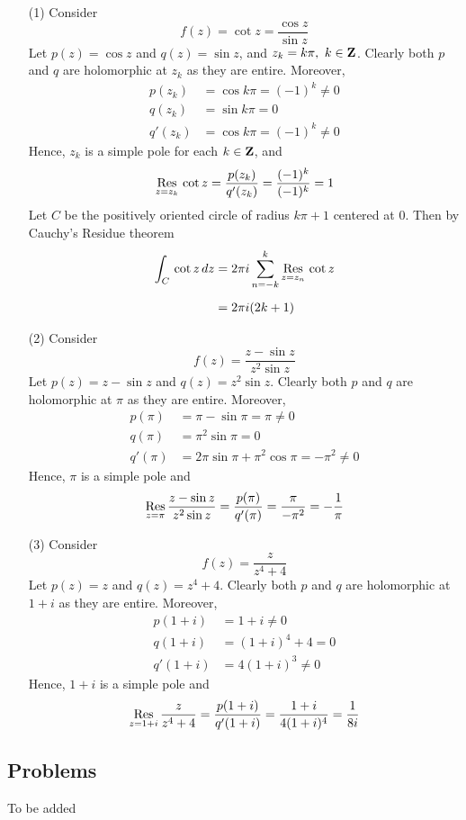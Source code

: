 \begin{example}\hfill
\begin{itemize}[itemsep=1em]
\item[(1)] Consider \[f(z) = \cot z = \frac{\cos z}{\sin z}\] Let $p(z) = \cos z$ and $q(z) = \sin z$, and $z_k = k\pi,\ k \in \mathbf Z$. Clearly both $p$ and $q$ are holomorphic at $z_k$ as they are entire. Moreover,
\begin{align*}
p(z_k) &= \cos k\pi = (-1)^k \neq 0\\[0.5em]
q(z_k) &= \sin k\pi = 0\\[0.5em]
q'(z_k) &= \cos k\pi = (-1)^k \neq 0
\end{align*}
Hence, $z_k$ is a simple pole for each $k \in \mathbf Z$, and
\[\underset{z = {z_k}}{\operatorname{Res}}\,\cot z = \frac{p(z_k)}{q'(z_k)} = \frac{(-1)^k}{(-1)^k} = 1\]
Let $C$ be the positively oriented circle of radius $k\pi + 1$ centered at $0$. Then by Cauchy's Residue theorem
\begin{align*}
\int_C\,\cot z\,dz &= 2\pi i\sum_{n=-k}^k\underset{z = {z_n}}{\operatorname{Res}}\,\cot z\\[0.5em]
 &= 2\pi i(2k + 1)
\end{align*}

\item[(2)] Consider \[f(z) = \frac{z - \sin z}{z^2\sin z}\] Let $p(z) = z - \sin z$ and $q(z) = z^2\sin z$. Clearly both $p$ and $q$ are holomorphic at $\pi$ as they are entire. Moreover,
\begin{align*}
p(\pi) &= \pi - \sin \pi = \pi \neq 0\\[0.5em]
q(\pi) &= \pi^2\sin \pi = 0\\[0.5em]
q'(\pi) &= 2\pi\sin \pi + \pi^2\cos \pi = -\pi^2 \neq 0
\end{align*}
Hence, $\pi$ is a simple pole and
\[\underset{z = {\pi}}{\operatorname{Res}}\,\frac{z - \sin z}{z^2\sin z} = \frac{p(\pi)}{q'(\pi)} = \frac{\pi}{-\pi^2} = -\frac{1}{\pi}\]

\item[(3)] Consider \[f(z) = \frac{z}{z^4 + 4}\] Let $p(z) = z$ and $q(z) = z^4 + 4$. Clearly both $p$ and $q$ are holomorphic at $1 + i$ as they are entire. Moreover,
\begin{align*}
p(1+i) &= 1 + i \neq 0\\[0.5em]
q(1+i) &= (1+i)^4 + 4 = 0\\[0.5em]
q'(1+i) &= 4(1+i)^3 \neq 0
\end{align*}
Hence, $1+i$ is a simple pole and
\[\underset{z = {1+i}}{\operatorname{Res}}\,\frac{z}{z^4 + 4} = \frac{p(1+i)}{q'(1+i)} = \frac{1+i}{4(1+i)^4} = \frac{1}{8i}\]
\end{itemize}
\end{example}

\vspace*{2em}

\subsection{Problems}
\vspace{0.1in}
To be added
%
